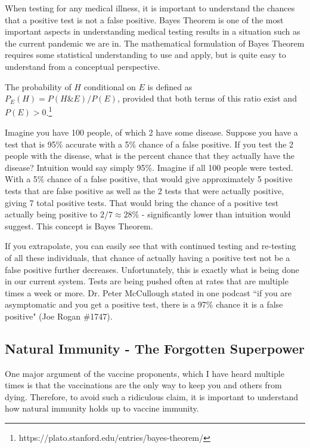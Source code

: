 \documentclass[10pt, a4paper, twocolumn]{book}
\begin{document}
When testing for any medical illness, it is important to understand the chances that a positive test is not a false positive. Bayes Theorem is one of the most important aspects in understanding medical testing results in a situation such as the current pandemic we are in. The mathematical formulation of Bayes Theorem requires some statistical understanding to use and apply, but is quite easy to understand from a conceptual perspective.

\begin{fancybox}{}
	The probability of $H$ conditional on $E$ is defined as $P_E(H) = P(H \& E)/P(E)$, provided that both terms of this ratio exist and $P(E)>0$.\footnote{https://plato.stanford.edu/entries/bayes-theorem/}
\end{fancybox}

Imagine you have 100 people, of which 2 have some disease. Suppose you have a test that is 95\% accurate with a 5\% chance of a false positive. If you test the 2 people with the disease, what is the percent chance that they actually have the disease? Intuition would say simply 95\%. Imagine if all 100 people were tested. With a 5\% chance of a false positive, that would give approximately 5 positive tests that are false positive as well as the 2 tests that were actually positive, giving 7 total positive tests. That would bring the chance of a positive test actually being positive to $2/7 \approx 28\%$ - significantly lower than intuition would suggest. This concept is Bayes Theorem. 

If you extrapolate, you can easily see that with continued testing and re-testing of all these individuals, that chance of actually having a positive test not be a false positive further decreases. Unfortunately, this is exactly what is being done in our current system. Tests are being pushed often at rates that are multiple times a week or more. Dr. Peter McCullough stated in one podcast ``if you are asymptomatic and you get a positive test, there is a 97\% chance it is a false positive" (Joe Rogan \#1747).







\subsection{Natural Immunity - The Forgotten Superpower}

One major argument of the vaccine proponents, which I have heard multiple times is that the vaccinations are the only way to keep you and others from dying. Therefore, to avoid such a ridiculous claim, it is important to understand how natural immunity holds up to vaccine immunity. 
\end{document}
